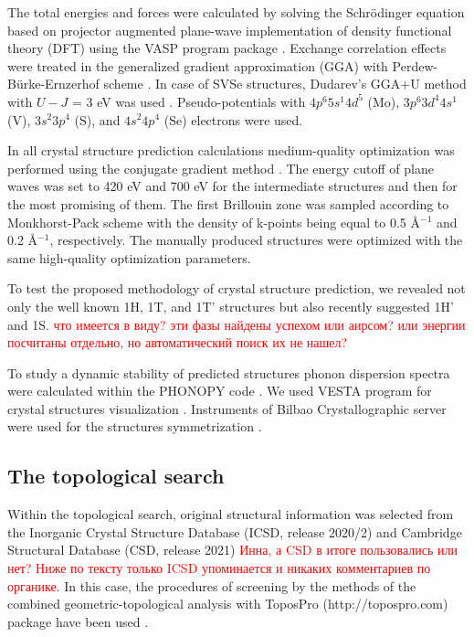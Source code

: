 \documentclass[a4paperm]{article}
\begin{document}
The total energies and forces were calculated by solving the Schr\"{o}dinger equation based on projector augmented plane-wave implementation \cite{blochl1994projector} of density functional theory (DFT) using the VASP program package \cite{vasp1,vasp2}.
Exchange correlation effects were treated in the generalized gradient approximation (GGA) with Perdew-B\"{u}rke-Ernzerhof scheme \cite{pbe}.
In case of SVSe structures, Dudarev’s GGA+U method \cite{gga+u} with $U-J$ = 3 eV was used \cite{PhysRevB.93.054429,C6CP06732H}.
Pseudo-potentials with $4p^6 5s^1 4d^5$ (Mo), $3p^6 3d^4 4s^1$ (V), $3s^2 3p^4$ (S), and $4s^2 4p^4$ (Se) electrons were used.

In all crystal structure prediction calculations medium-quality optimization was performed using the conjugate gradient method \cite{conjugate_gradient}. 
The energy cutoff of plane waves was set to 420 eV and 700 eV for the intermediate structures and then for the most promising of them. 
The first Brillouin zone was sampled according to Monkhorst-Pack scheme \cite{monkhorst1976special} with the density of k-points being equal to 0.5 \AA$^{-1}$ and 0.2 \AA$^{-1}$, respectively. 
The manually produced structures were optimized with the same high-quality optimization parameters.

To test the proposed methodology of crystal structure prediction, we revealed not only the well known 1H, 1T, and 1T' structures but also recently suggested 1H' and 1S. \textcolor{red}{что имеется в виду? эти фазы найдены успехом или аирсом? или энергии посчитаны отдельно, но автоматический поиск их не нашел?}


To study a dynamic stability of predicted structures phonon dispersion spectra were calculated within the PHONOPY code \cite{phonopy}. 
We used VESTA program for crystal structures visualization \cite{momma2011vesta}.
Instruments of Bilbao Crystallographic server were used for the structures symmetrization \cite{bilbao}.



\subsection*{The topological search}

Within the topological search, original structural information was selected from the Inorganic Crystal Structure Database (ICSD, release 2020/2) \cite{icsd_1} and Cambridge Structural Database (CSD, release 2021) \cite{icsd_2} 
\textcolor{red}{Инна, а CSD в итоге пользовались или нет? Ниже по тексту только ICSD упоминается и никаких комментариев по органике}.
In this case, the procedures of screening  by the methods of the combined geometric-topological analysis with ToposPro (http://topospro.com) package have been used \cite{topos_1}. 
\end{document}
